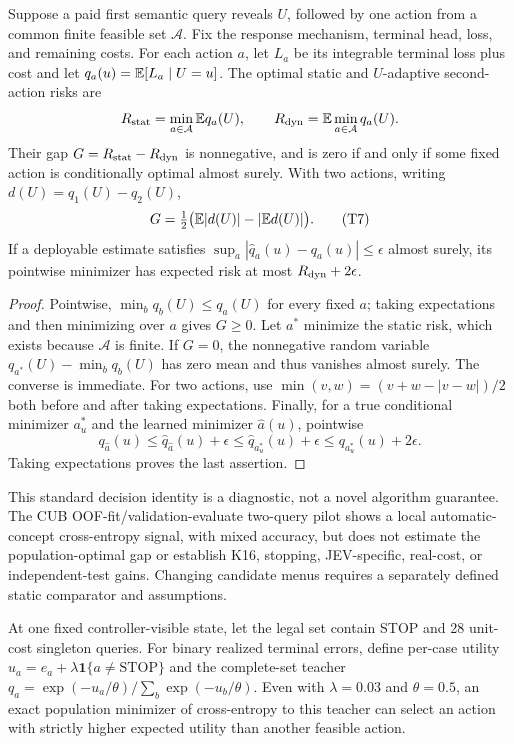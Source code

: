 \begin{acamprop}
\label{prop:acam-conditional-gap}
Suppose a paid first semantic query reveals $U$, followed by one action
from a common finite feasible set $\mathcal A$. Fix the response mechanism,
terminal head, loss, and remaining costs. For each action $a$, let $L_a$
be its integrable terminal loss plus cost and let
$q_a(u)=\mathbb{E}[L_a\mid U=u]$. The optimal static and $U$-adaptive
second-action risks are
\[
 R_{\rm stat}=\min_{a\in\mathcal A}\mathbb{E} q_a(U),\qquad
 R_{\rm dyn}=\mathbb{E}\min_{a\in\mathcal A}q_a(U).
\]
Their gap $G=R_{\rm stat}-R_{\rm dyn}$ is nonnegative, and is zero if and
only if some fixed action is conditionally optimal almost surely. With
two actions, writing $d(U)=q_1(U)-q_2(U)$,
\[
 G=\tfrac12\bigl(\mathbb{E}|d(U)|-|\mathbb{E} d(U)|\bigr). \tag{T7}
\]
If a deployable estimate satisfies
$\sup_a|\widehat q_a(u)-q_a(u)|\leq\epsilon$ almost surely, its
pointwise minimizer has expected risk at most $R_{\rm dyn}+2\epsilon$.
\end{acamprop}

\begin{proof}
Pointwise, $\min_bq_b(U)\leq q_a(U)$ for every fixed $a$; taking
expectations and then minimizing over $a$ gives $G\geq0$. Let $a^*$
minimize the static risk, which exists because $\mathcal A$ is finite.
If $G=0$, the nonnegative random variable
$q_{a^*}(U)-\min_bq_b(U)$ has zero mean and thus vanishes almost surely.
The converse is immediate. For two actions, use
$\min(v,w)=(v+w-|v-w|)/2$ both before and after taking expectations.
Finally, for a true conditional minimizer $a_u^*$ and the learned
minimizer $\widehat a(u)$, pointwise
\[
 q_{\widehat a}(u)
 \leq\widehat q_{\widehat a}(u)+\epsilon
 \leq\widehat q_{a_u^*}(u)+\epsilon
 \leq q_{a_u^*}(u)+2\epsilon.
\]
Taking expectations proves the last assertion.
\end{proof}

This standard decision identity is a diagnostic, not a novel algorithm
guarantee. The CUB OOF-fit/validation-evaluate two-query pilot shows a
local automatic-concept cross-entropy signal, with mixed accuracy, but
does not estimate the population-optimal gap or establish K16, stopping,
JEV-specific, real-cost, or independent-test gains. Changing candidate
menus requires a separately defined static comparator and assumptions.

\begin{acamprop}
\label{prop:acam-choice-softmax-gap}
At one fixed controller-visible state, let the legal set contain STOP
and 28 unit-cost singleton queries. For binary realized terminal errors,
define per-case utility $u_a=e_a+\lambda\mathbf{1}\{a\ne\mathrm{STOP}\}$ and the
complete-set teacher $q_a=\exp(-u_a/\theta)/\sum_b\exp(-u_b/\theta)$.
Even with $\lambda=0.03$ and $\theta=0.5$, an exact population minimizer
of cross-entropy to this teacher can select an action with strictly
higher expected utility than another feasible action.
\end{acamprop}

